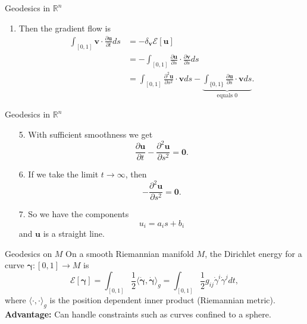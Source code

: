 \documentclass[usenames,dvipsnames]{beamer}
\theoremstyle{definition}
\theoremstyle{theorem}
\newcommand{\R}{\mathbb{R}}
\newcommand{\position}{\boldsymbol{\gamma}}
\newcommand{\velocity}{\boldsymbol{\dot{\gamma}}}
\begin{document}
    \begin{frame}{Geodesics in $\R^n$}
        \begin{enumerate}[4.]
            \item Then the gradient flow is
            \begin{align*}
            \int_{[0,1]} \mathbf{v}\cdot  \frac{\partial \mathbf{u}}{\partial t} ds&= - \delta_\mathbf{v} \mathcal{E}[\mathbf{u}]\\
            &= -\int_{[0,1]} \frac{\partial \mathbf{u}}{\partial s}\cdot \frac{\partial \mathbf{v}}{\partial s}ds\\
            &= \int_{[0,1]} \frac{\partial^2 \mathbf{u}}{\partial s^2}\cdot \mathbf{v} ds - \underbrace{\int_{\{0,1\}} \frac{\partial \mathbf{u}}{\partial s}\cdot \mathbf{v}ds}_{\textrm{equals 0}}.
            \end{align*}
        \end{enumerate}
    \end{frame}
    
    \begin{frame}{Geodesics in $\R^n$}
        \begin{itemize}
            \item[5.] With sufficient smoothness we get
            \[
            \frac{\partial \mathbf{u}}{\partial t} -\frac{\partial^2 \mathbf{u}}{\partial s^2}=\mathbf{0}.
            \]
            \item[6.] If we take the limit $t\to \infty$, then
            \[
            -\frac{\partial^2 \mathbf{u}}{\partial s^2}=\mathbf{0}.
            \]
            \item[7.] So we have the components
            \[
            u_i = a_i s + b_i
            \]
            and $\mathbf{u}$ is a straight line.
        \end{itemize}
    \end{frame}
    
    \begin{frame}{Geodesics on $M$}
        On a smooth Riemannian manifold $M$, the Dirichlet energy for a curve $\position \colon [0,1] \to M$ is
        \[
        \mathcal{E}[\position] = \int_{[0,1]} \frac{1}{2} \langle \velocity,\velocity \rangle_{g} = \int_{[0,1]} \frac{1}{2}  g_{ij} \dot{\gamma}^i \dot{\gamma}^j dt,
        \]
        where $\langle \cdot,\cdot \rangle_g$ is the position dependent inner product (Riemannian metric).\\
        \vspace*{.5cm}
        \noindent \textbf{Advantage:} Can handle constraints such as curves confined to a sphere.
    \end{frame}
    
\end{document}
